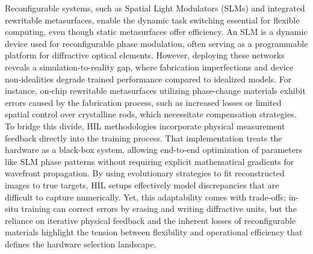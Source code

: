 \documentclass[11pt]{article}
\begin{document}
Reconfigurable systems, such as Spatial Light Modulators (SLMs) and integrated rewritable metasurfaces, enable the dynamic task switching essential for flexible computing, even though static metasurfaces offer efficiency. \citep{doi_10_1002_adom_202300561_c4d7a5b0} \citep{doi_10_32446_0368_1025it_2023_12_35_39_fb1bb2c3} An SLM is a dynamic device used for reconfigurable phase modulation, often serving as a programmable platform for diffractive optical elements. However, deploying these networks reveals a simulation-to-reality gap, where fabrication imperfections and device non-idealities degrade trained performance compared to idealized models. For instance, on-chip rewritable metasurfaces utilizing phase-change materials exhibit errors caused by the fabrication process, such as increased losses or limited spatial control over crystalline rods, which necessitate compensation strategies. To bridge this divide, HIL methodologies incorporate physical measurement feedback directly into the training process. That implementation treats the hardware as a black-box system, allowing end-to-end optimization of parameters like SLM phase patterns without requiring explicit mathematical gradients for wavefront propagation. By using evolutionary strategies to fit reconstructed images to true targets, HIL setups effectively model discrepancies that are difficult to capture numerically. Yet, this adaptability comes with trade-offs; in-situ training can correct errors by erasing and writing diffractive units, but the reliance on iterative physical feedback and the inherent losses of reconfigurable materials highlight the tension between flexibility and operational efficiency that defines the hardware selection landscape. \citep{doi_10_1038_s41598_025_19638_8_1b2db1c9} \citep{doi_10_1364_oe_461549_b2d41b3f}
\end{document}
